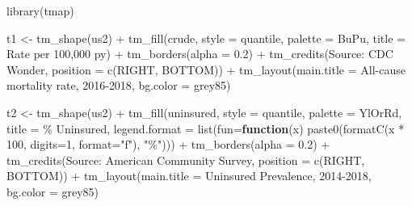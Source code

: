 \documentclass[
]{book}
\newenvironment{Shaded}{\begin{snugshade}}{\end{snugshade}}
\newcommand{\AttributeTok}[1]{\textcolor[rgb]{0.77,0.63,0.00}{#1}}
\newcommand{\ControlFlowTok}[1]{\textcolor[rgb]{0.13,0.29,0.53}{\textbf{#1}}}
\newcommand{\DecValTok}[1]{\textcolor[rgb]{0.00,0.00,0.81}{#1}}
\newcommand{\FloatTok}[1]{\textcolor[rgb]{0.00,0.00,0.81}{#1}}
\newcommand{\FunctionTok}[1]{\textcolor[rgb]{0.00,0.00,0.00}{#1}}
\newcommand{\NormalTok}[1]{#1}
\newcommand{\OtherTok}[1]{\textcolor[rgb]{0.56,0.35,0.01}{#1}}
\newcommand{\SpecialCharTok}[1]{\textcolor[rgb]{0.00,0.00,0.00}{#1}}
\newcommand{\StringTok}[1]{\textcolor[rgb]{0.31,0.60,0.02}{#1}}
\begin{document}
\begin{Shaded}
\begin{Highlighting}[]
\FunctionTok{library}\NormalTok{(tmap)}

\NormalTok{t1 }\OtherTok{\textless{}{-}} \FunctionTok{tm\_shape}\NormalTok{(us2) }\SpecialCharTok{+} 
  \FunctionTok{tm\_fill}\NormalTok{(}\StringTok{\textquotesingle{}crude\textquotesingle{}}\NormalTok{,}
          \AttributeTok{style =} \StringTok{\textquotesingle{}quantile\textquotesingle{}}\NormalTok{,}
          \AttributeTok{palette =} \StringTok{\textquotesingle{}BuPu\textquotesingle{}}\NormalTok{,}
          \AttributeTok{title =} \StringTok{\textquotesingle{}Rate per 100,000 py\textquotesingle{}}\NormalTok{) }\SpecialCharTok{+} 
  \FunctionTok{tm\_borders}\NormalTok{(}\AttributeTok{alpha =} \FloatTok{0.2}\NormalTok{) }\SpecialCharTok{+}
\FunctionTok{tm\_credits}\NormalTok{(}\StringTok{\textquotesingle{}Source: CDC Wonder\textquotesingle{}}\NormalTok{,}
           \AttributeTok{position =} \FunctionTok{c}\NormalTok{(}\StringTok{\textquotesingle{}RIGHT\textquotesingle{}}\NormalTok{, }\StringTok{\textquotesingle{}BOTTOM\textquotesingle{}}\NormalTok{)) }\SpecialCharTok{+} 
\FunctionTok{tm\_layout}\NormalTok{(}\AttributeTok{main.title =} \StringTok{\textquotesingle{}All{-}cause mortality rate, 2016{-}2018\textquotesingle{}}\NormalTok{,}
          \AttributeTok{bg.color =} \StringTok{\textquotesingle{}grey85\textquotesingle{}}\NormalTok{)}

\NormalTok{t2 }\OtherTok{\textless{}{-}} \FunctionTok{tm\_shape}\NormalTok{(us2) }\SpecialCharTok{+} 
  \FunctionTok{tm\_fill}\NormalTok{(}\StringTok{\textquotesingle{}uninsured\textquotesingle{}}\NormalTok{,}
          \AttributeTok{style =} \StringTok{\textquotesingle{}quantile\textquotesingle{}}\NormalTok{,}
          \AttributeTok{palette =} \StringTok{\textquotesingle{}YlOrRd\textquotesingle{}}\NormalTok{,}
          \AttributeTok{title =} \StringTok{\textquotesingle{}\% Uninsured\textquotesingle{}}\NormalTok{,}
          \AttributeTok{legend.format =} \FunctionTok{list}\NormalTok{(}\AttributeTok{fun=}\ControlFlowTok{function}\NormalTok{(x) }\FunctionTok{paste0}\NormalTok{(}\FunctionTok{formatC}\NormalTok{(x }\SpecialCharTok{*} \DecValTok{100}\NormalTok{, }
                                                              \AttributeTok{digits=}\DecValTok{1}\NormalTok{, }
                                                              \AttributeTok{format=}\StringTok{"f"}\NormalTok{), }\StringTok{"\%"}\NormalTok{))) }\SpecialCharTok{+}
  \FunctionTok{tm\_borders}\NormalTok{(}\AttributeTok{alpha =} \FloatTok{0.2}\NormalTok{) }\SpecialCharTok{+}
\FunctionTok{tm\_credits}\NormalTok{(}\StringTok{\textquotesingle{}Source: American Community Survey\textquotesingle{}}\NormalTok{,}
           \AttributeTok{position =} \FunctionTok{c}\NormalTok{(}\StringTok{\textquotesingle{}RIGHT\textquotesingle{}}\NormalTok{, }\StringTok{\textquotesingle{}BOTTOM\textquotesingle{}}\NormalTok{)) }\SpecialCharTok{+} 
\FunctionTok{tm\_layout}\NormalTok{(}\AttributeTok{main.title =} \StringTok{\textquotesingle{}Uninsured Prevalence, 2014{-}2018\textquotesingle{}}\NormalTok{,}
          \AttributeTok{bg.color =} \StringTok{\textquotesingle{}grey85\textquotesingle{}}\NormalTok{)}



\end{Highlighting}
\end{Shaded}
\end{document}
